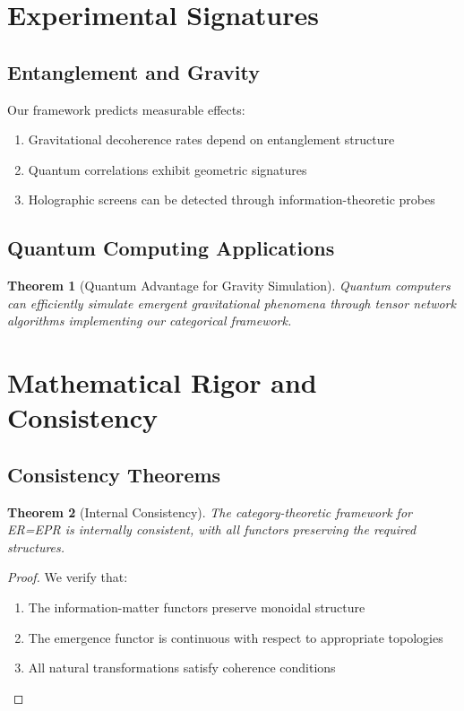\documentclass[11pt,a4paper]{article}
\newtheorem{theorem}{Theorem}[section]
\begin{document}
\section{Experimental Signatures}

\subsection{Entanglement and Gravity}

Our framework predicts measurable effects:

\begin{enumerate}
\item Gravitational decoherence rates depend on entanglement structure
\item Quantum correlations exhibit geometric signatures
\item Holographic screens can be detected through information-theoretic probes
\end{enumerate}

\subsection{Quantum Computing Applications}

\begin{theorem}[Quantum Advantage for Gravity Simulation]
Quantum computers can efficiently simulate emergent gravitational phenomena through tensor network algorithms implementing our categorical framework.
\end{theorem}

\section{Mathematical Rigor and Consistency}

\subsection{Consistency Theorems}

\begin{theorem}[Internal Consistency]
The category-theoretic framework for ER=EPR is internally consistent, with all functors preserving the required structures.
\end{theorem}

\begin{proof}
We verify that:
\begin{enumerate}
\item The information-matter functors preserve monoidal structure
\item The emergence functor is continuous with respect to appropriate topologies
\item All natural transformations satisfy coherence conditions
\end{enumerate}
\end{proof}
\end{document}

